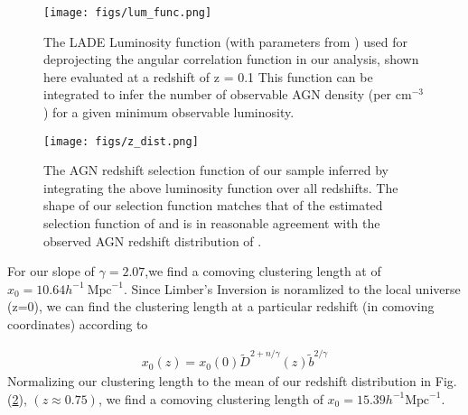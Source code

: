 \documentclass[preprint]{aastex63}
\begin{document}
    \begin{figure}[!ht]
        \centering
        \texttt{[image: figs/lum\_func.png]}
        \label{fig:lum_func}
        \caption{The LADE Luminosity function (with parameters from \citet{aird:2010}) used for deprojecting the angular correlation function in our analysis, shown here evaluated at a redshift of z = 0.1
        This function can be integrated to infer the number of observable AGN density (per $\text{cm}^{-3}$) for a given minimum observable luminosity.}
    \end{figure}
    
    \begin{figure}[!ht]
        \centering
        \texttt{[image: figs/z\_dist.png]}
        \label{fig:z_dist}
        \caption{The AGN redshift selection function of our sample  inferred by integrating the above luminosity function over all redshifts. 
        The shape of our selection function matches that of the estimated selection function of \citet{ebrero} and is in reasonable agreement with 
        the observed AGN redshift distribution of \citet{plionis:2018}.}
    \end{figure}
    
    For our slope of $\gamma = 2.07$,we find a comoving clustering length at 
    of $x_0 = 10.64 h^{-1} \  \text{Mpc}^{-1}$. Since Limber's Inversion is noramlized to the local universe (z=0), we can find the clustering length at a particular redshift 
    (in comoving coordinates) according to 
    
    
    \begin{align}
        \label{eq:clustering_length}
        x_0(z) = x_0(0) \tilde D^{2+n/\gamma}(z) \tilde b^{2/\gamma}
    \end{align}
    Normalizing our clustering length to the mean of our redshift distribution in Fig. (\ref{fig:z_dist}), $(z \approx 0.75)$, we find a comoving clustering length 
    of $x_0 = 15.39 h^{-1} \text{Mpc}^{-1}$.
\end{document}
